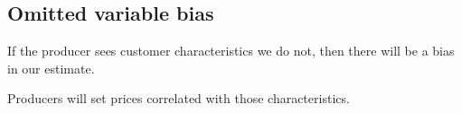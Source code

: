 
\subsection{Omitted variable bias}

If the producer sees customer characteristics we do not, then there will be a bias in our estimate.

Producers will set prices correlated with those characteristics.


